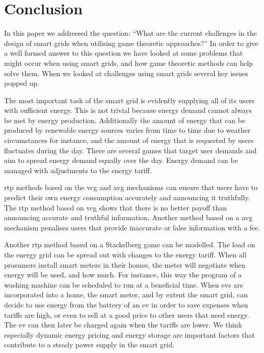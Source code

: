 \section{Conclusion}\label{conclusion}
\acresetall
In this paper we addressed the question: ``What are the current challenges in the design of smart grids when utilising game theoretic approaches?'' In order to give a well formed answer to this question we have looked at some problems that might occur when using smart grids, and how game theoretic methods can help solve them. When we looked at challenges using smart grids several key issues popped up. 

The most important task of the smart grid is evidently supplying all of its users with sufficient energy. This is not trivial because energy demand cannot always be met by energy production. Additionally the amount of energy that can be produced by renewable energy sources varies from time to time due to weather circumstances for instance, and the amount of energy that is requested by users fluctuates during the day. There are several games that target user demands and aim to spread energy demand equally over the day. Energy demand can be managed with adjustments to the energy tariff. 

\ac{rtp} methods based on the \ac{vcg} and \ac{avg} mechanisms can ensure that users have to predict their own energy consumption accurately and announcing it truthfully. The \ac{rtp} method based on \ac{vcg} shows that there is no better payoff than announcing accurate and truthful information. Another method based on a \ac{avg} mechanism penalises users that provide inaccurate or false information with a fee.

Another \ac{rtp} method based on a Stackelberg game can be modelled. The load on the energy grid can be spread out with changes to the energy tariff. When all prosumers install smart meters in their homes, the meter will negotiate when energy will be used, and how much. For instance, this way the program of a washing machine can be scheduled to run at a beneficial time. When \acp{ev} are incorporated into a home, the smart meter, and by extent the smart grid, can decide to use energy from the battery of an \ac{ev} in order to save expenses when tariffs are high, or even to sell at a good price to other users that need energy. The \ac{ev} can then later be charged again when the tariffs are lower. 
We think especially dynamic energy pricing and energy storage are important factors that contribute to a steady power supply in the smart grid.

